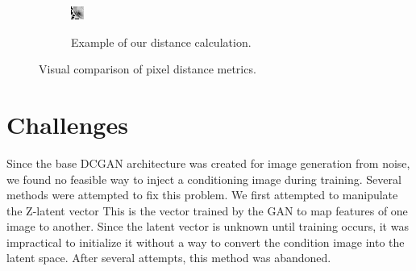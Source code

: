 \documentclass[letterpaper]{article} %
\begin{document}
\begin{figure}[h!]
\begin{subfigure}{0.22\textwidth}
\begin{center}
\begin{minipage}[t]{0.75\linewidth}
\begin{centering}
{\includegraphics[width=\linewidth]{shadow_ours.png}}
\caption{Example of our distance calculation.}
\label{fig:shadow_ours}
\end{centering}
\end{minipage}
\end{center}
\end{subfigure}
\caption{Visual comparison of pixel distance metrics.}
\label{fig:pixel_distance}
\end{figure}

\section{Challenges}
Since the base DCGAN architecture was created for image generation from noise,
we found no feasible way to inject a conditioning image during training.
Several methods were attempted to fix this problem.
We first attempted to manipulate the Z-latent vector
This is the vector trained by the GAN to map features of one image to another.
Since the latent vector is unknown until training occurs,
it was impractical to initialize it without a way to convert
the condition image into the latent space.
After several attempts, this method was abandoned.
\end{document}
